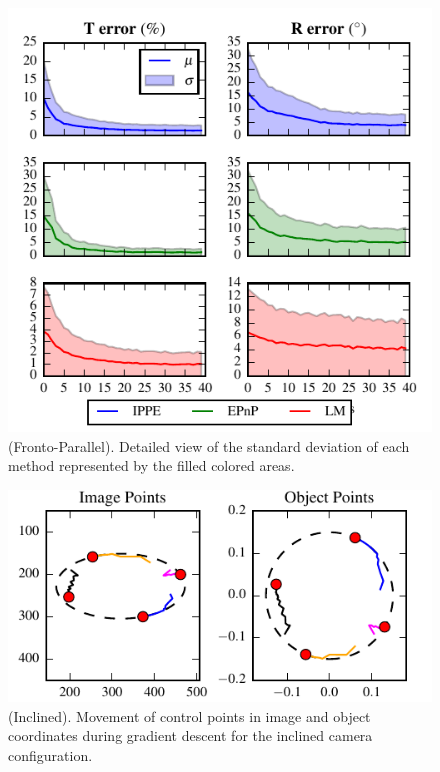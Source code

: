 \documentclass[letterpaper, 10 pt, conference]{ieeeconf}  %
\begin{document}
	\begin{figure}[t]
		\begin{center}
			\includegraphics[width=\columnwidth]{img/pose_separate_fronto_parallel.pdf}
			\caption{\label{fig:FP_pnp_results_detailed}\small(Fronto-Parallel). Detailed view of the standard deviation of each method represented by the filled colored areas.}
		\end{center}
		\vspace{-0.5cm}
	\end{figure}
	
	\begin{figure}[t]
		\begin{center}
			\includegraphics[width=\columnwidth]{img/image_control_points_inclined.pdf}
			\caption{\label{fig:IN_points} \small (Inclined). Movement of control points in image and object coordinates during gradient descent for the inclined camera configuration.}
		\end{center}
		\vspace{-0.5cm}
	\end{figure}
	
\end{document}
